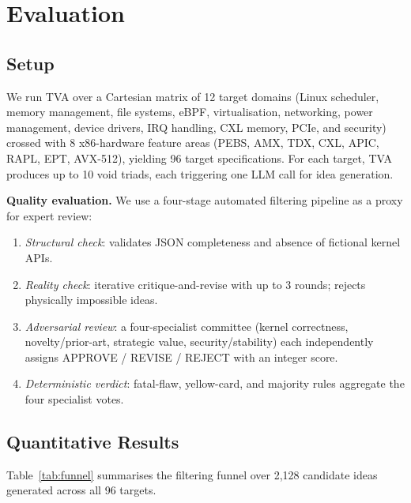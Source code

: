 \documentclass[11pt,twocolumn]{article}
\begin{document}
\section{Evaluation}
\label{sec:eval}

\subsection{Setup}

We run TVA over a Cartesian matrix of 12 target domains (Linux
scheduler, memory management, file systems, eBPF, virtualisation,
networking, power management, device drivers, IRQ handling, CXL
memory, PCIe, and security) crossed with 8 x86-hardware
feature areas (PEBS, AMX, TDX, CXL, APIC, RAPL, EPT, AVX-512),
yielding 96 target specifications.  For each target, TVA produces up
to 10 void triads, each triggering one LLM call for idea generation.

\textbf{Quality evaluation.}  We use a four-stage automated filtering
pipeline as a proxy for expert review:
\begin{enumerate}
  \item \textit{Structural check}: validates JSON completeness and
    absence of fictional kernel APIs.
  \item \textit{Reality check}: iterative critique-and-revise with up
    to 3 rounds; rejects physically impossible ideas.
  \item \textit{Adversarial review}: a four-specialist committee
    (kernel correctness, novelty/prior-art, strategic value,
    security/stability) each independently assigns APPROVE / REVISE /
    REJECT with an integer score.
  \item \textit{Deterministic verdict}: fatal-flaw, yellow-card, and
    majority rules aggregate the four specialist votes.
\end{enumerate}

\subsection{Quantitative Results}

Table~\ref{tab:funnel} summarises the filtering funnel over 2,128
candidate ideas generated across all 96 targets.
\end{document}
